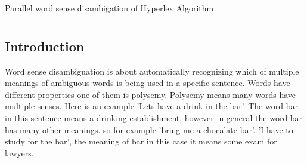 \documentclass[article,dr=phil,type=drfinal,colorback,accentcolor=tud9c]{tudthesis}
\begin{document}
    {Parallel word sense disambigation of Hyperlex Algorithm}
  \author{Viswanath Vadhri}
  \dateofexam{\today}{\today}
  \makethesistitle

\newpage
\begin{abstract}
Word sense disambiguation (WSD) is the ability to identify the intended meanings of words (word senses) in a context. It is a central research topic in Natural Language Processing (NLP). Word sense disambiguation is often characterized as an intermediate task, which is not an end in itself, but essential for many applications requiring broad-coverage language understanding. Examples include machine translation, information retrieval, information extraction or text mining.

Hyperlex is an unsupervised graph-based technique used in Natural Language Processing that is capable of automatically determining word senses from a large text base without recourse to a dictionary with excellent precision. In this thesis, we design and implement the Hyperlex algorithm as a scalable application which runs on the cluster and can process data of magnitude Terabytes. We analyse the results of the implementation.
\end{abstract}


\newpage
\tableofcontents

\newpage
\chapter{}
  \section{Introduction}
  Word sense disambiguation is about automatically recognizing which of multiple meanings of ambiguous words is being used in a specific sentence. Words have different properties one of them is polysemy. Polysemy means many words have multiple senses. Here is an example 'Lets have a drink in the bar'. The word bar in this sentence means a drinking establishment, however in general the word bar has many other meanings. so for example 'bring me a chocalate bar'. 'I have to study for the bar', the meaning of bar in this case it means some exam for lawyers.
\end{document}
